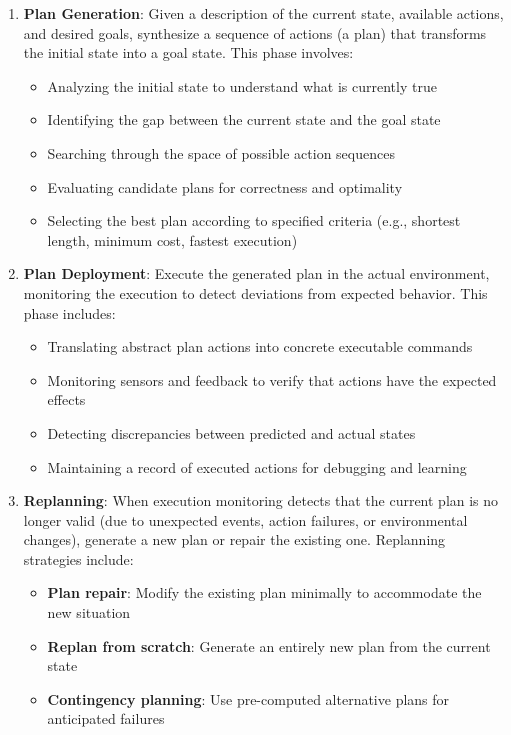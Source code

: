 \documentclass[11pt,a4paper]{article}
\theoremstyle{definition}
\theoremstyle{plain}
\theoremstyle{remark}
\begin{document}
\begin{enumerate}
    \item \textbf{Plan Generation}: Given a description of the current state, available actions, and desired goals, synthesize a sequence of actions (a plan) that transforms the initial state into a goal state. This phase involves:
    \begin{itemize}
        \item Analyzing the initial state to understand what is currently true
        \item Identifying the gap between the current state and the goal state
        \item Searching through the space of possible action sequences
        \item Evaluating candidate plans for correctness and optimality
        \item Selecting the best plan according to specified criteria (e.g., shortest length, minimum cost, fastest execution)
    \end{itemize}
    
    \item \textbf{Plan Deployment}: Execute the generated plan in the actual environment, monitoring the execution to detect deviations from expected behavior. This phase includes:
    \begin{itemize}
        \item Translating abstract plan actions into concrete executable commands
        \item Monitoring sensors and feedback to verify that actions have the expected effects
        \item Detecting discrepancies between predicted and actual states
        \item Maintaining a record of executed actions for debugging and learning
    \end{itemize}
    
    \item \textbf{Replanning}: When execution monitoring detects that the current plan is no longer valid (due to unexpected events, action failures, or environmental changes), generate a new plan or repair the existing one. Replanning strategies include:
    \begin{itemize}
        \item \textbf{Plan repair}: Modify the existing plan minimally to accommodate the new situation
        \item \textbf{Replan from scratch}: Generate an entirely new plan from the current state
        \item \textbf{Contingency planning}: Use pre-computed alternative plans for anticipated failures
    \end{itemize}
\end{enumerate}
\end{document}
